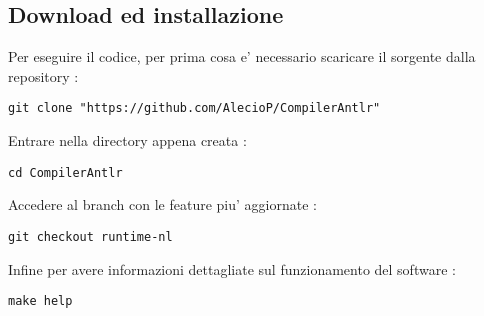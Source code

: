 \documentclass{article}
\begin{document}
\subsection{Download ed installazione}

Per eseguire il codice, per prima cosa e' necessario scaricare il sorgente dalla repository : 

\begin{lstlisting}
git clone "https://github.com/AlecioP/CompilerAntlr"
\end{lstlisting} 
Entrare nella directory appena creata :

\begin{lstlisting}
cd CompilerAntlr
\end{lstlisting}
Accedere al branch con le feature piu' aggiornate :
\begin{lstlisting}
git checkout runtime-nl
\end{lstlisting}
Infine per avere informazioni dettagliate sul funzionamento del software :
\begin{lstlisting}
make help
\end{lstlisting}
\end{document}
